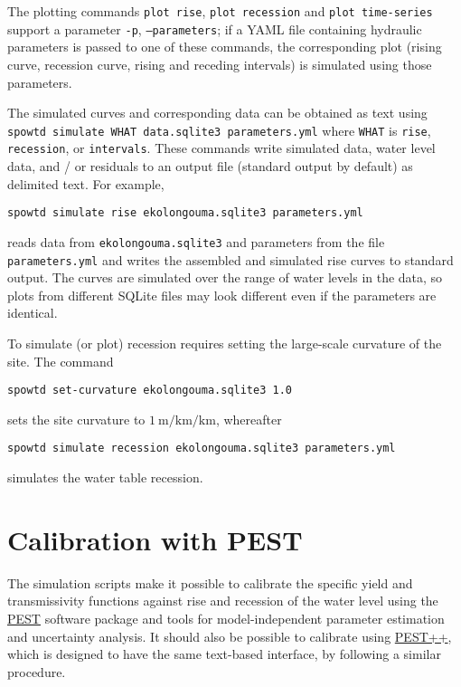 \documentclass[11pt,a4paper]{article}
\begin{document}
The plotting commands \texttt{plot rise}, \texttt{plot recession} and
\texttt{plot time-series} support a parameter \texttt{-p},
\texttt{--parameters}; if a YAML file containing hydraulic parameters
is passed to one of these commands, the corresponding plot (rising
curve, recession curve, rising and receding intervals) is simulated
using those parameters.

The simulated curves and corresponding data can be obtained as text
using \texttt{spowtd simulate WHAT data.sqlite3 parameters.yml} where
\texttt{WHAT} is \texttt{rise}, \texttt{recession}, or
\texttt{intervals}.  These commands write simulated data, water level
data, and / or residuals to an output file (standard output by
default) as delimited text.  For example,
\begin{lstlisting}[frame=single]
spowtd simulate rise ekolongouma.sqlite3 parameters.yml
\end{lstlisting}
reads data from \texttt{ekolongouma.sqlite3} and parameters from the
file \texttt{parameters.yml} and writes the assembled and simulated
rise curves to standard output.  The curves are simulated over the
range of water levels in the data, so plots from different SQLite
files may look different even if the parameters are identical.

To simulate (or plot) recession requires setting the large-scale
curvature of the site.  The command
\begin{lstlisting}[frame=single]
  spowtd set-curvature ekolongouma.sqlite3 1.0
\end{lstlisting}
sets the site curvature to $1~\text{m}/\text{km}/\text{km}$, whereafter
\begin{lstlisting}[frame=single]
  spowtd simulate recession ekolongouma.sqlite3 parameters.yml
\end{lstlisting}
simulates the water table recession.

\section{Calibration with PEST}
The simulation scripts make it possible to calibrate the specific
yield and transmissivity functions against rise and recession of the
water level using the \href{https://pesthomepage.org/}{PEST} software
package and tools for model-independent parameter estimation and
uncertainty analysis.  It should also be possible to calibrate using
\href{https://www.usgs.gov/software/pest-software-suite-parameter-estimation-uncertainty-analysis-management-optimization-and}{PEST++},
which is designed to have the same text-based interface, by following
a similar procedure.
\end{document}
